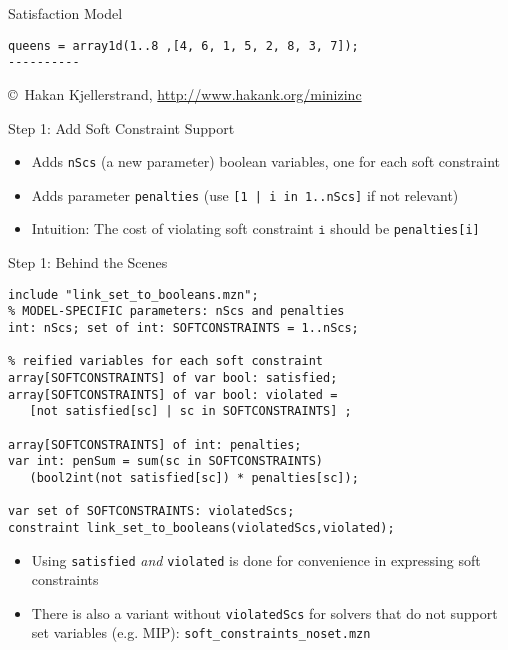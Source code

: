 \documentclass[10pt,xcolor={dvipsnames},fleqn]{beamer}
\begin{document}
\begin{frame}[fragile]{Satisfaction Model}

\small
\begin{verbatim}
queens = array1d(1..8 ,[4, 6, 1, 5, 2, 8, 3, 7]);
----------
\end{verbatim}
\copyright~Hakan Kjellerstrand, \url{http://www.hakank.org/minizinc}
\end{frame}

\begin{frame}[fragile]{Step 1: Add Soft Constraint Support}


\begin{itemize}
\item Adds \texttt{nScs} (a new parameter) boolean variables, one for each soft constraint
\item Adds parameter \texttt{penalties} (use \texttt{[1 | i in 1..nScs]} if not relevant)
\item Intuition: The cost of violating soft constraint $\mathtt{i}$ should be \texttt{penalties[i]} 
\end{itemize}
\end{frame}

\begin{frame}[fragile]{Step 1: Behind the Scenes}

\begin{lstlisting}
include "link_set_to_booleans.mzn";
% MODEL-SPECIFIC parameters: nScs and penalties
int: nScs; set of int: SOFTCONSTRAINTS = 1..nScs;

% reified variables for each soft constraint
array[SOFTCONSTRAINTS] of var bool: satisfied;
array[SOFTCONSTRAINTS] of var bool: violated = 
   [not satisfied[sc] | sc in SOFTCONSTRAINTS] ;

array[SOFTCONSTRAINTS] of int: penalties;
var int: penSum = sum(sc in SOFTCONSTRAINTS)
   (bool2int(not satisfied[sc]) * penalties[sc]);

var set of SOFTCONSTRAINTS: violatedScs;
constraint link_set_to_booleans(violatedScs,violated); 
\end{lstlisting}
\begin{itemize}
\item Using \texttt{satisfied} \emph{and} \texttt{violated} is done for convenience in expressing 
soft constraints
\item There is also a variant without \texttt{violatedScs} for solvers that do not
support set variables (e.g. MIP): \texttt{soft\_constraints\_noset.mzn} 
\end{itemize}
\end{frame}
\end{document}

